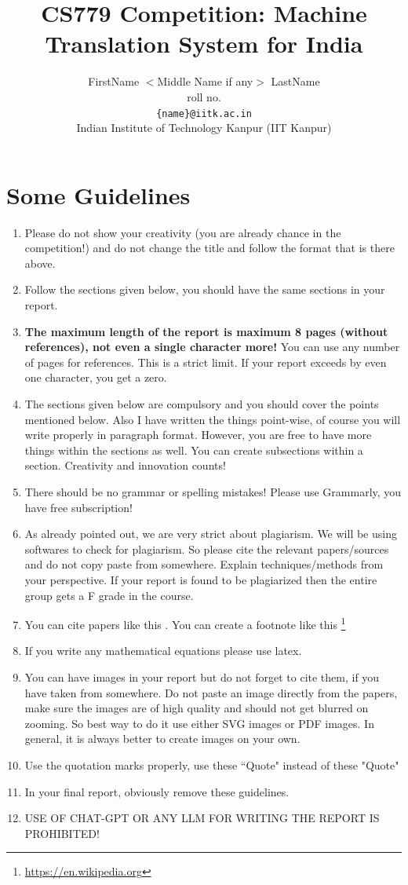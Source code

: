 \documentclass[11pt, oneside]{article}   	%
\title{CS779 Competition: Machine Translation System for India}
\author{
    FirstName $<$Middle Name if any$>$ LastName  \\ 
    roll no.\\
   {\tt \{name\}@iitk.ac.in}\\
{Indian Institute of Technology Kanpur (IIT Kanpur)}
}
\date{}							%
\begin{document}
\maketitle



\section*{Some Guidelines}
\begin{enumerate}
\item Please do not show your creativity (you are already chance in the competition!) and  do not change the title and follow the format that is there above.
\item Follow the sections given below, you should have the same sections in your report.
\item \textbf{The maximum length of the report is maximum 8 pages (without references), not even a single character more!} You can use any number of pages for references. This is a strict limit. If your report exceeds by even one character, you get a zero.
\item The sections given below are compulsory and you should cover the points mentioned below. Also I have written the things point-wise, of course you will write properly in paragraph format. However, you are free to have more things within the sections as well. You can create subsections within a section.  Creativity and innovation counts! 
\item There should be no grammar or spelling mistakes! Please use Grammarly, you have free subscription! 
\item As already pointed out, we are very strict about plagiarism. We will be using softwares to check for plagiarism. So please cite the relevant papers/sources and do not copy paste from somewhere. Explain techniques/methods from your perspective. If your report is found to be plagiarized then the entire group gets a F grade in the course.  
\item You can cite papers like this \cite{sepehr:AAMAS2019, colombo:NAACL2019}. You can create a footnote like this \footnote{\url{https://en.wikipedia.org}} 
\item If you write any mathematical equations please use latex. 
\item You can have images in your report but do not forget to cite them, if you have taken from somewhere. Do not paste an image directly from the papers, make sure the images are of high quality and should not get blurred on zooming. So best way to do it use either SVG images or PDF images. In general, it is always better to create images on your own. 
\item Use the quotation marks properly, use these ``Quote" instead of these "Quote"
\item In your final report, obviously remove these guidelines. 
\item USE OF CHAT-GPT OR ANY LLM FOR WRITING THE REPORT IS PROHIBITED! 
\end{enumerate}
\end{document}
